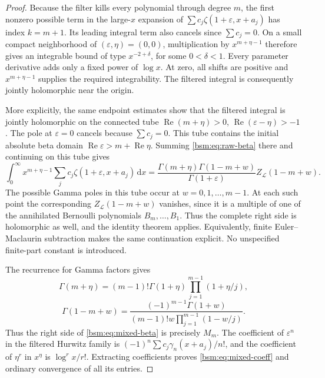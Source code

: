 \documentclass[11pt,letterpaper]{article}
\numberwithin{equation}{section}
\theoremstyle{definition}\newtheorem{definition}[theorem]{Definition}
\theoremstyle{remark}\newtheorem{remark}[theorem]{Remark}
\DeclareMathOperator{\Ree}{Re}
\newcommand{\dd}{\,\mathrm{d}}
\newcommand{\Lcal}{\mathcal L}
\newcommand{\eps}{\varepsilon}
\begin{document}
\begin{proof}
Because the filter kills every polynomial through degree $m$, the
first nonzero possible term in the large-$x$ expansion of
$\sum c_j\zeta(1+\eps,x+a_j)$ has index $k=m+1$. Its leading integral
term also cancels since $\sum c_j=0$. On a small compact neighborhood
of $(\eps,\eta)=(0,0)$, multiplication by $x^{m+\eta-1}$ therefore
gives an integrable bound of type $x^{-2+\delta}$, for some
$0<\delta<1$. Every parameter derivative adds only a fixed power of
$\log x$. At zero, all shifts are positive and
$x^{m+\eta-1}$ supplies the required integrability. The filtered
integral is consequently jointly holomorphic near the origin.

More explicitly, the same endpoint estimates show that the filtered
integral is jointly holomorphic on the connected tube
$\Ree(m+\eta)>0$, $\Ree(\eps-\eta)>-1$. The pole at
$\eps=0$ cancels because $\sum c_j=0$. This tube contains the
initial absolute beta domain $\Ree\eps>m+\Ree\eta$.
Summing \eqref{bsm:eq:raw-beta} there and continuing on this tube gives
\begin{equation}\label{bsm:eq:mixed-beta}
 \int_0^\infty x^{m+\eta-1}
         \sum_jc_j\zeta(1+\eps,x+a_j)\dd x
 =\frac{\Gamma(m+\eta)\Gamma(1-m+w)}{\Gamma(1+\eps)}
                                  Z_{\Lcal}(1-m+w).
\end{equation}
The possible Gamma poles in this tube occur at
$w=0,1,\ldots,m-1$. At each such point the corresponding
$Z_{\Lcal}(1-m+w)$ vanishes, since it is a multiple of one of the
annihilated Bernoulli polynomials $B_m,\ldots,B_1$.
Thus the complete right side is holomorphic as well, and the identity
theorem applies. Equivalently, finite Euler--Maclaurin subtraction
makes the same continuation explicit. No unspecified finite-part
constant is introduced.

The recurrence for Gamma factors gives
\[
 \Gamma(m+\eta)=(m-1)!\Gamma(1+\eta)
                       \prod_{j=1}^{m-1}(1+\eta/j),
\]
\[
 \Gamma(1-m+w)=\frac{(-1)^{m-1}\Gamma(1+w)}
                   {(m-1)!w\prod_{j=1}^{m-1}(1-w/j)}.
\]
Thus the right side of \eqref{bsm:eq:mixed-beta} is precisely
$M_m$. The coefficient of $\eps^n$ in the filtered Hurwitz family is
$(-1)^n\sum c_j\gamma_n(x+a_j)/n!$, and the coefficient of
$\eta^r$ in $x^\eta$ is $\log^r x/r!$. Extracting coefficients proves
\eqref{bsm:eq:mixed-coeff} and ordinary convergence of all its entries.
\end{proof}
\end{document}
